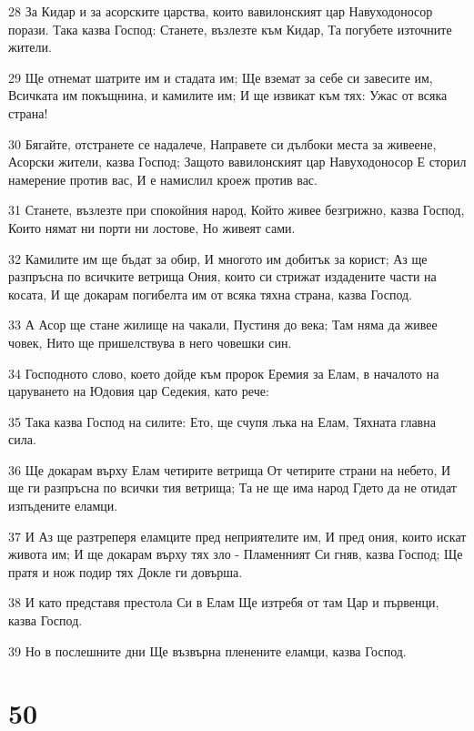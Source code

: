 \par 28 За Кидар и за асорските царства, които вавилонският цар Навуходоносор порази. Така казва Господ: Станете, възлезте към Кидар, Та погубете източните жители.
\par 29 Ще отнемат шатрите им и стадата им; Ще вземат за себе си завесите им, Всичката им покъщнина, и камилите им; И ще извикат към тях: Ужас от всяка страна!
\par 30 Бягайте, отстранете се надалече, Направете си дълбоки места за живеене, Асорски жители, казва Господ; Защото вавилонският цар Навуходоносор Е сторил намерение против вас, И е намислил кроеж против вас.
\par 31 Станете, възлезте при спокойния народ, Който живее безгрижно, казва Господ, Които нямат ни порти ни лостове, Но живеят сами.
\par 32 Камилите им ще бъдат за обир, И многото им добитък за корист; Аз ще разпръсна по всичките ветрища Ония, които си стрижат издадените части на косата, И ще докарам погибелта им от всяка тяхна страна, казва Господ.
\par 33 А Асор ще стане жилище на чакали, Пустиня до века; Там няма да живее човек, Нито ще пришелствува в него човешки син.
\par 34 Господното слово, което дойде към пророк Еремия за Елам, в началото на царуването на Юдовия цар Седекия, като рече:
\par 35 Така казва Господ на силите: Ето, ще счупя лъка на Елам, Тяхната главна сила.
\par 36 Ще докарам върху Елам четирите ветрища От четирите страни на небето, И ще ги разпръсна по всички тия ветрища; Та не ще има народ Гдето да не отидат изпъдените еламци.
\par 37 И Аз ще разтреперя еламците пред неприятелите им, И пред ония, които искат живота им; И ще докарам върху тях зло - Пламенният Си гняв, казва Господ; Ще пратя и нож подир тях Докле ги довърша.
\par 38 И като представя престола Си в Елам Ще изтребя от там Цар и първенци, казва Господ.
\par 39 Но в послешните дни Ще възвърна пленените еламци, казва Господ.

\chapter{50}

